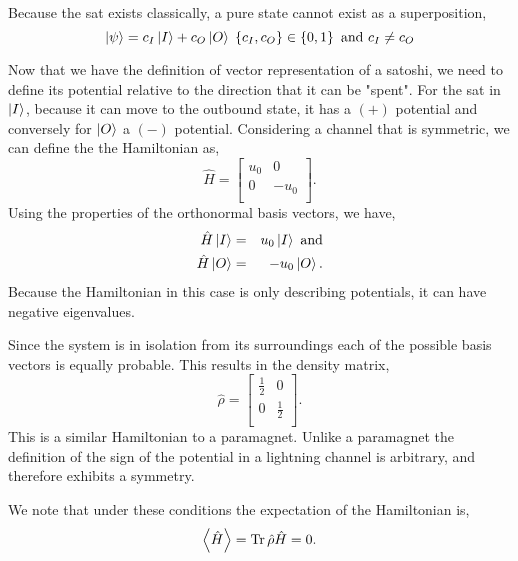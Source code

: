 \documentclass[review,12pt]{elsarticle}
\DeclareMathOperator{\Tr}{\mathrm{Tr}}
\begin{document}
Because the sat exists classically, a pure state cannot exist as a superposition,
\begin{equation}
  \Ket{\psi} = c_I\Ket{I} + c_O\Ket{O} \; \left\{c_I,c_O\right\} \in \left\{0,1\right\} \textrm{ and } c_I \neq c_O \nonumber
\end{equation}

Now that we have the definition of vector representation of a satoshi, we need to define its potential relative to the direction that it can be "spent".
For the sat in $\Ket{I}$, because it can move to the outbound state, it has a $(+)$ potential and conversely for $\Ket{O}$ a $(-)$ potential.
Considering a channel that is symmetric, we can define the the Hamiltonian as,
\begin{equation}
  \hat{H} = \left[ {\begin{array}{cc}
          u_0 & 0    \\
          0   & -u_0 \\
        \end{array} } \right].\nonumber
\end{equation}
Using the properties of the orthonormal basis vectors, we have,
\begin{eqnarray}
  \hat{H}\Ket{I} & = & u_0\Ket{I} \textrm{ and} \nonumber\\
  \hat{H}\Ket{O} & = & -u_0\Ket{O}. \nonumber
\end{eqnarray}
Because the Hamiltonian in this case is only describing potentials, it can have negative eigenvalues.

Since the system is in isolation from its surroundings each of the possible basis vectors is equally probable.
This results in the density matrix,
\begin{equation}
  \hat{\rho} = \left[ {\begin{array}{cc}
          \frac{1}{2} & 0           \\
          0           & \frac{1}{2} \\
        \end{array} } \right].\nonumber
\end{equation}
This is a similar Hamiltonian to a paramagnet.
Unlike a paramagnet the definition of the sign of the potential in a lightning channel is arbitrary, and therefore exhibits a symmetry.

We note that under these conditions the expectation of the Hamiltonian is,
\begin{equation}
  \Braket{\hat{H}} = \Tr \hat{\rho}\hat{H} = 0. \nonumber
\end{equation}
\end{document}
